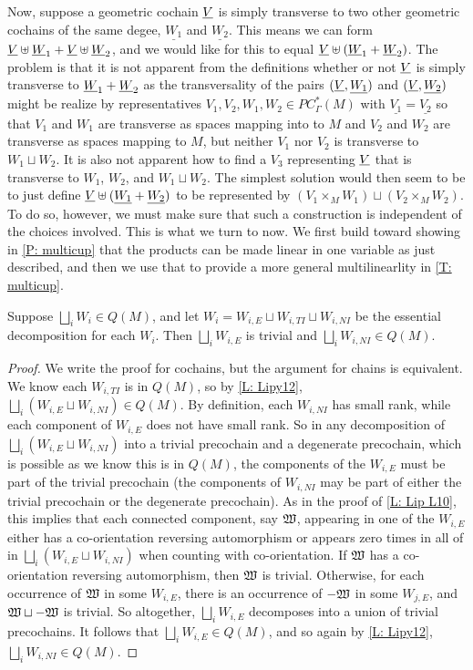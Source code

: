 Now, suppose a geometric cochain $\underline{V}$ is simply transverse to two other geometric cochains of the same degee, $\underline{W_1}$ and $\underline{W_2}$. This means we can form $\underline{V}\uplus \underline{W}_1+\underline{V}\uplus \underline{W}_2$, and we would like for this to equal $\underline{V}\uplus (\underline{W}_1+\underline{W}_2)$. The problem is that it is not apparent from the definitions whether or not $\underline{V}$ is simply transverse to $\underline{W}_1+\underline{W}_2$ as the transversality of the pairs $(\underline{V},\underline{W_1})$ and $(\underline{V},\underline{W_2})$ might be realize by representatives $V_1,V_2, W_1,W_2 \in PC^*_\Gamma(M)$ with $\underline{V_1} = \underline{V_2}$ so that $V_1$ and $W_1$ are transverse as spaces mapping into to $M$ and $V_2$ and $W_2$ are transverse as spaces mapping to $M$, but neither $V_1$ nor $V_2$ is transverse to $W_1 \sqcup W_2$. It is also not apparent how to find a $V_3$ representing $\underline{V}$ that is transverse to $W_1$, $W_2$, and $W_1 \sqcup W_2$. The simplest solution would then seem to be to just define
$\underline{V}\uplus (\underline{W_1}+\underline{W_2})$ to be represented by $(V_1 \times_M W_1) \sqcup (V_2 \times_M W_2)$. To do so, however, we must make sure that such a construction is independent of the choices involved. This is what we turn to now. We first build toward showing in \cref{P: multicup} that the products can be made linear in one variable as just described, and then we use that to provide a more general multilinearlity in \cref{T: multicup}.

\begin{lemma}\label{L: Q essential}
Suppose $\bigsqcup_i W_i \in Q(M)$, and let $W_i = W_{i,E} \sqcup W_{i,TI} \sqcup W_{i,NI}$ be the essential decomposition for each $W_i$. Then $\bigsqcup_i W_{i,E}$ is trivial and $\bigsqcup_i W_{i,NI} \in Q(M)$.
\end{lemma}
\begin{proof}
We write the proof for cochains, but the argument for chains is equivalent.
We know each $W_{i,TI}$ is in $Q(M)$, so by \cref{L: Lipy12}, $\bigsqcup_i (W_{i,E} \sqcup W_{i,NI}) \in Q(M)$.
By definition, each $W_{i,NI}$ has small rank, while each component of $W_{i,E}$ does not have small rank. So in any decomposition of $\bigsqcup_i (W_{i,E} \sqcup W_{i,NI})$ into a trivial precochain and a degenerate precochain, which is possible as we know this is in $Q(M)$, the components of the $W_{i,E}$ must be part of the trivial precochain (the components of $W_{i, NI}$ may be part of either the trivial precochain or the degenerate precochain). As in the proof of \cref{L: Lip L10}, this implies that each connected component, say $\mathfrak W$, appearing in one of the $W_{i,E}$ either has a co-orientation reversing automorphism or appears zero times in all of in $\bigsqcup_i (W_{i,E} \sqcup W_{i,NI})$ when counting with co-orientation. If $\mathfrak W$ has a co-orientation reversing automorphism, then $\mathfrak W$ is trivial. Otherwise, for each occurrence of $\mathfrak W$ in some $W_{i,E}$, there is an occurrence of $-\mathfrak W$ in some $W_{j,E}$, and $\mathfrak W \sqcup -\mathfrak W$ is trivial. So altogether, $\bigsqcup_i W_{i,E}$ decomposes into a union of trivial precochains. It follows that $\bigsqcup_i W_{i,E} \in Q(M)$, and so again by \cref{L: Lipy12}, $\bigsqcup_i W_{i,NI} \in Q(M)$.
\end{proof}


